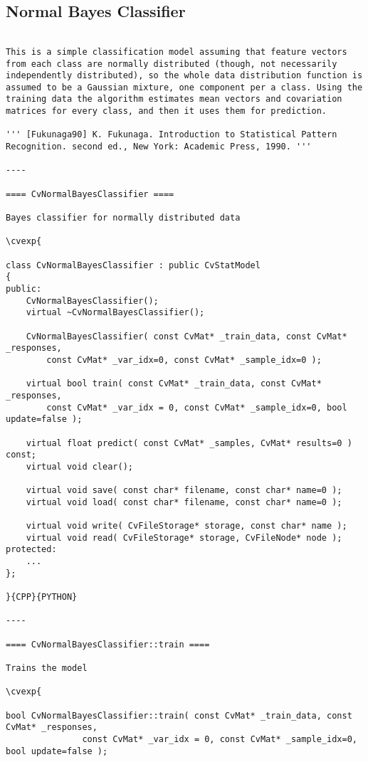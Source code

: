 \subsection{Normal Bayes Classifier}
\begin{verbatim}

This is a simple classification model assuming that feature vectors from each class are normally distributed (though, not necessarily independently distributed), so the whole data distribution function is assumed to be a Gaussian mixture, one component per a class. Using the training data the algorithm estimates mean vectors and covariation matrices for every class, and then it uses them for prediction.

''' [Fukunaga90] K. Fukunaga. Introduction to Statistical Pattern Recognition. second ed., New York: Academic Press, 1990. '''

----

==== CvNormalBayesClassifier ====

Bayes classifier for normally distributed data

\cvexp{

class CvNormalBayesClassifier : public CvStatModel
{
public:
    CvNormalBayesClassifier();
    virtual ~CvNormalBayesClassifier();

    CvNormalBayesClassifier( const CvMat* _train_data, const CvMat* _responses,
        const CvMat* _var_idx=0, const CvMat* _sample_idx=0 );

    virtual bool train( const CvMat* _train_data, const CvMat* _responses,
        const CvMat* _var_idx = 0, const CvMat* _sample_idx=0, bool update=false );

    virtual float predict( const CvMat* _samples, CvMat* results=0 ) const;
    virtual void clear();

    virtual void save( const char* filename, const char* name=0 );
    virtual void load( const char* filename, const char* name=0 );

    virtual void write( CvFileStorage* storage, const char* name );
    virtual void read( CvFileStorage* storage, CvFileNode* node );
protected:
    ...
};

}{CPP}{PYTHON}

----

==== CvNormalBayesClassifier::train ====

Trains the model

\cvexp{

bool CvNormalBayesClassifier::train( const CvMat* _train_data, const CvMat* _responses,
               const CvMat* _var_idx = 0, const CvMat* _sample_idx=0, bool update=false );


\end{verbatim}
